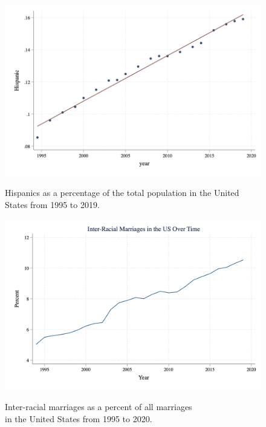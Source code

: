 \documentclass[12pt, fullpage]{article}
\begin{document}
\newpage

\begin{figure}[H]
\begin{center}
\caption{Hispanics as a percentage of the total population in the United States from 1995 to 2019.}
\includegraphics[width=\textwidth]{HispanicUSA.png} 
\label{fig:2}
\end{center}
\end{figure}

\newpage

\begin{figure}[H]
\begin{center}
\caption{Inter-racial marriages as a percent of all marriages \\
 in the United States from 1995 to 2020.}
\includegraphics[width=\textwidth]{interracialovertime.png} 
\label{fig:3}
\end{center}
\end{figure}
\end{document}
